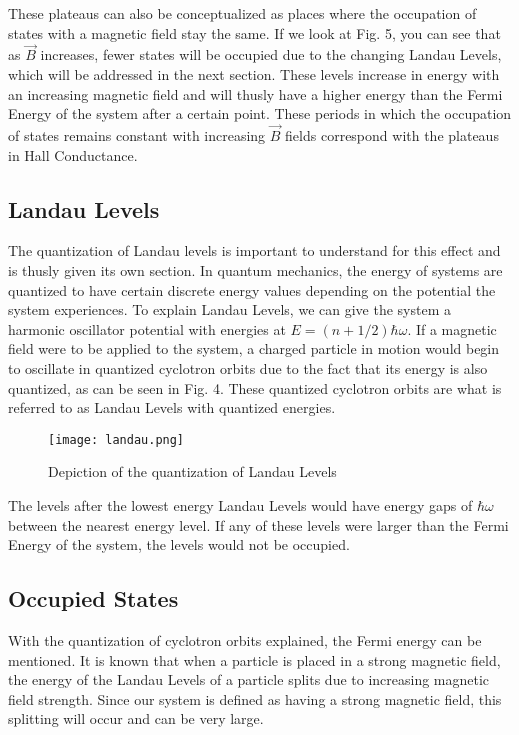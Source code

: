 \documentclass[14pt]{article}
\begin{document}
These plateaus can also be conceptualized as places where the occupation of states with a magnetic field stay the same. If we look at Fig. 5, you can see that as $\vec{B}$ increases, fewer states will be occupied due to the changing Landau Levels, which will be addressed in the next section. These levels increase in energy with an increasing magnetic field and will thusly have a higher energy than the Fermi Energy of the system after a certain point. These periods in which the occupation of states remains constant with increasing $\vec{B}$ fields correspond with the plateaus in Hall Conductance\cite{qhe paper}\cite{fqhe talk}.

\subsection*{Landau Levels}

The quantization of Landau levels is important to understand for this effect and is thusly given its own section. In quantum mechanics, the energy of systems are quantized to have certain discrete energy values depending on the potential the system experiences. To explain Landau Levels, we can give the system a harmonic oscillator potential with energies at $E=(n+1/2)\hbar\omega$. If a magnetic field were to be applied to the system, a charged particle in motion would begin to oscillate in quantized cyclotron orbits due to the fact that its energy is also quantized, as can be seen in Fig. 4. These quantized cyclotron orbits are what is referred to as Landau Levels with quantized energies.\\


\begin{figure}[ht]
	\centering
	\texttt{[image: landau.png]}
	\label{fig:sheet3}
	\caption{Depiction of the quantization of Landau Levels\cite{llpic}}
\end{figure}

The levels after the lowest energy Landau Levels would have energy gaps of $\hbar\omega$ between the nearest energy level. If any of these levels were larger than the Fermi Energy of the system, the levels would not be occupied\cite{kittel}.

\subsection*{Occupied States}

With the quantization of cyclotron orbits explained, the Fermi energy can be mentioned. It is known that when a particle is placed in a strong magnetic field, the energy of the Landau Levels of a particle splits due to increasing magnetic field strength. Since our system is defined as having a strong magnetic field, this splitting will occur and can be very large. \\
\end{document}
